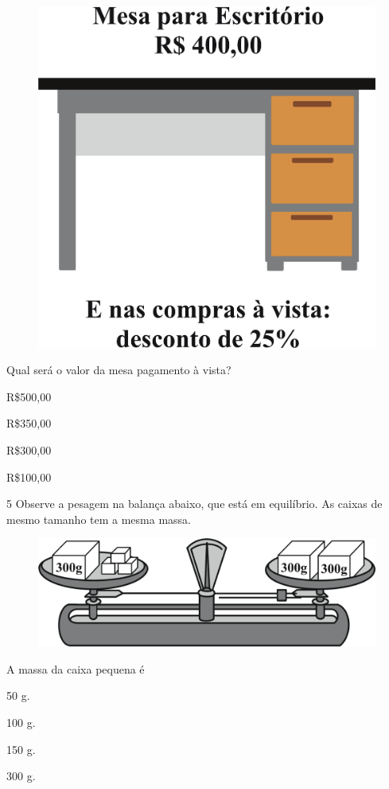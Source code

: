 \begin{figure}[htpb!]
\centering
\includegraphics[width=.5\textwidth]{./ilustras-mat/Simulado_3-atividade_4.png}
\end{figure}


Qual será o valor da mesa pagamento à vista?

\begin{escolha}

\item R\$500,00

\item R\$350,00

\item R\$300,00

\item R\$100,00

\end{escolha}

\num{5} Observe a pesagem na balança abaixo, que está em equilíbrio. As
caixas de mesmo tamanho tem a mesma massa.

\begin{figure}[htpb!]
\centering
\includegraphics[width=.5\textwidth]{./ilustras-mat/Simulado_3-atividade_5.png}
\end{figure}

A massa da caixa pequena é

\begin{escolha}

  \item 50 g. 

  \item 100 g. 

  \item 150 g. 

  \item 300 g.

\end{escolha}

